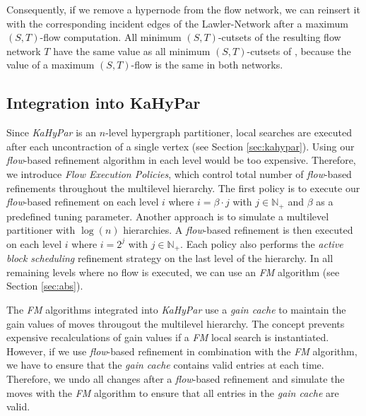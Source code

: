 Consequently, if we remove a hypernode from the flow network, we can reinsert it with the
corresponding incident edges of the Lawler-Network after a maximum $(S,T)$-flow computation.
All minimum $(S,T)$-cutsets of the resulting flow network $T$  have the same value as all minimum
$(S,T)$-cutsets of , because the value of a maximum $(S,T)$-flow is the same in both networks.


\subsection{Integration into KaHyPar}
\label{sec:integration_kahypar}  

\normalfont\normalsize
Since \emph{KaHyPar} is an $n$-level hypergraph partitioner, local searches
are executed after each uncontraction of a single vertex (see Section \ref{sec:kahypar}). 
Using our \emph{flow}-based refinement algorithm in each level would be too expensive.
Therefore, we introduce \emph{Flow Execution Policies}, which control total number of
\emph{flow}-based refinements throughout the multilevel hierarchy. The first policy is to 
execute our \emph{flow}-based refinement on each level $i$ where $i = \beta\cdot j$ with 
$j \in \mathbb{N}_+$ and $\beta$ as a predefined tuning parameter. Another approach is to simulate a
multilevel partitioner with $\log(n)$ hierarchies. A \emph{flow}-based refinement is then
executed on each level $i$ where $i = 2^j$ with $j \in \mathbb{N}_+$. Each policy also
performs the \emph{active block scheduling} refinement strategy on the last level of the
hierarchy. In all remaining levels where no flow is executed, we can use an 
\emph{FM} algorithm 
\cite{akhremtsev2017engineering,fiduccia1988linear,sanchis1989multiple} (see Section 
\ref{sec:abs}). 

\normalfont\normalsize
The \emph{FM} algorithms integrated into \emph{KaHyPar} use a \emph{gain cache} to maintain
the gain values of moves througout the multilevel hierarchy. The concept prevents expensive recalculations
of gain values if a \emph{FM} local search is instantiated. However, if we use \emph{flow}-based
refinement in combination with the \emph{FM} algorithm, we have to ensure that the 
\emph{gain cache} contains valid entries at each time. Therefore, we undo all changes after a \emph{flow}-based
refinement and simulate the moves with the \emph{FM} algorithm to ensure that all entries in
the \emph{gain cache} are valid.

